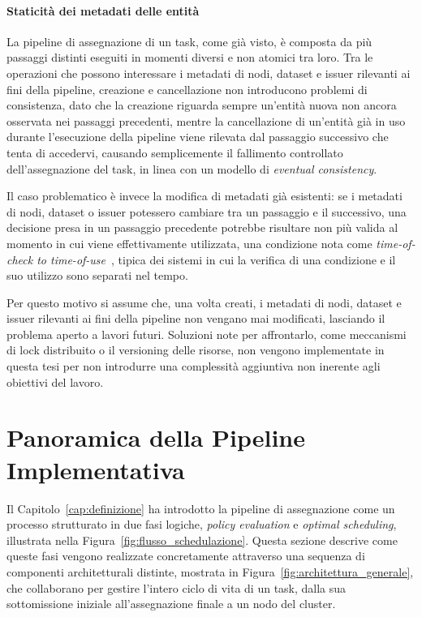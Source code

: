 \paragraph{Staticità dei metadati delle entità}
\label{impl:staticita_metadati}

La pipeline di assegnazione di un task, come già visto, è composta da più passaggi distinti eseguiti in momenti diversi e non atomici tra loro. Tra le operazioni che possono interessare i metadati di nodi, dataset e issuer rilevanti ai fini della pipeline, creazione e cancellazione non introducono problemi di consistenza, dato che la creazione riguarda sempre un'entità nuova non ancora osservata nei passaggi precedenti, mentre la cancellazione di un'entità già in uso durante l'esecuzione della pipeline viene rilevata dal passaggio successivo che tenta di accedervi, causando semplicemente il fallimento controllato dell'assegnazione del task, in linea con un modello di \emph{eventual consistency}.

Il caso problematico è invece la modifica di metadati già esistenti: se i metadati di nodi, dataset o issuer potessero cambiare tra un passaggio e il successivo, una decisione presa in un passaggio precedente potrebbe risultare non più valida al momento in cui viene effettivamente utilizzata, una condizione nota come \emph{time-of-check to time-of-use}~\cite{tictou-fix, tictou-unix}, tipica dei sistemi in cui la verifica di una condizione e il suo utilizzo sono separati nel tempo.

Per questo motivo si assume che, una volta creati, i metadati di nodi, dataset e issuer rilevanti ai fini della pipeline non vengano mai modificati, lasciando il problema aperto a lavori futuri. Soluzioni note per affrontarlo, come meccanismi di lock distribuito o il versioning delle risorse, non vengono implementate in questa tesi per non introdurre una complessità aggiuntiva non inerente agli obiettivi del lavoro.


\section{Panoramica della Pipeline Implementativa}
\label{sec:architettura_generale}

Il Capitolo~\ref{cap:definizione} ha introdotto la pipeline di assegnazione come un processo strutturato in due fasi logiche, \emph{policy evaluation} e \emph{optimal scheduling}, illustrata nella Figura~\ref{fig:flusso_schedulazione}. Questa sezione descrive come queste fasi vengono realizzate concretamente attraverso una sequenza di componenti architetturali distinte, mostrata in Figura~\ref{fig:architettura_generale}, che collaborano per gestire l'intero ciclo di vita di un task, dalla sua sottomissione iniziale all'assegnazione finale a un nodo del cluster.

